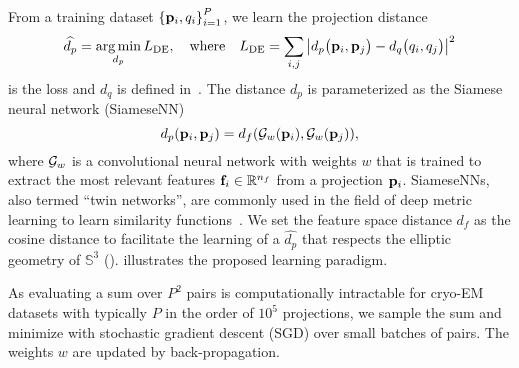 From a training dataset ${\{ \mathbf{p}_i, q_i \}}_{i=1}^{P}$, we learn the projection distance
\begin{equation}
    \widehat{d_p} = \operatorname*{arg\,min}_{d_p} L_\text{DE},
    \quad \text{where} \quad
    L_\text{DE} = \sum_{i,j} \left| d_p\big(\mathbf{p}_i,\mathbf{p}_j\big) - d_q\big(q_i,q_j\big) \right|^2
    \label{eqn:distance-learning}
\end{equation}
is the loss and $d_q$ is defined in~.
The distance $d_p$ is parameterized as the Siamese neural network (SiameseNN)~\cite{chopra2005learning}
\begin{equation*}
    d_p(\mathbf{p}_i, \mathbf{p}_j) = d_f(\mathcal{G}_w(\mathbf{p}_i), \mathcal{G}_w(\mathbf{p}_j)),
\end{equation*}
where $\mathcal{G}_w$ is a convolutional neural network with weights $w$ that is trained to extract the most relevant features $\mathbf{f}_i \in \mathbb{R}^{n_f}$ from a projection $\mathbf{p}_i$.
SiameseNNs, also termed ``twin networks'', are commonly used in the field of deep metric learning to learn similarity functions~\cite{yi2014deep}.
We set the feature space distance $d_f$ as the cosine distance to facilitate the learning of a $\widehat{d_p}$ that respects the elliptic geometry of $\mathbb{S}^3$ ().
 illustrates the proposed learning paradigm.

As evaluating a sum over $P^2$ pairs is computationally intractable for cryo-EM datasets with typically $P$ in the order of $10^5$ projections, we sample the sum and minimize  with stochastic gradient descent (SGD) over small batches of pairs.
The weights $w$ are updated by back-propagation.

